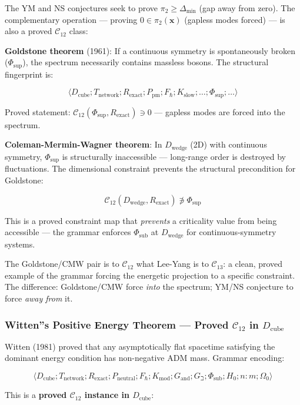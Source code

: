 \documentclass[12pt,a4paper]{article}
\begin{document}
The YM and NS conjectures seek to prove $\pi_2 \geq \Delta_\text{min}$ (gap away from zero). The complementary operation --- proving $0 \in \pi_2(\mathbf{x})$ (gapless modes forced) --- is also a proved $\mathcal{C}_{12}$ class:

\textbf{Goldstone theorem} (1961): If a continuous symmetry is spontaneously broken ($\Phi_\text{sup}$), the spectrum necessarily contains massless bosons. The structural fingerprint is:


\[\langle D_\text{cube}; T_\text{network}; R_\text{exact}; P_\text{pm}; F_{\hbar}; K_\text{slow}; \ldots; \Phi_\text{sup}; \ldots \rangle\]

Proved statement: $\mathcal{C}_{12}(\Phi_\text{sup}, R_\text{exact}) \ni 0$ --- gapless modes are forced into the spectrum. 

\textbf{Coleman-Mermin-Wagner theorem}: In $D_\text{wedge}$ (2D) with continuous symmetry, $\Phi_\text{sup}$ is structurally inaccessible --- long-range order is destroyed by fluctuations. The dimensional constraint prevents the structural precondition for Goldstone:


\[\mathcal{C}_{12}(D_\text{wedge}, R_\text{exact}) \not\ni \Phi_\text{sup}\]

This is a proved constraint map that \emph{prevents} a criticality value from being accessible --- the grammar enforces $\Phi_\text{sub}$ at $D_\text{wedge}$ for continuous-symmetry systems. 

The Goldstone/CMW pair is to $\mathcal{C}_{12}$ what Lee-Yang is to $\mathcal{C}_{13}$: a clean, proved example of the grammar forcing the energetic projection to a specific constraint. The difference: Goldstone/CMW force \emph{into} the spectrum; YM/NS conjecture to force \emph{away from} it.

\subsubsection{Witten''s Positive Energy Theorem --- Proved $\mathcal{C}_{12}$ in $D_\text{cube}$}

Witten (1981) proved that any asymptotically flat spacetime satisfying the dominant energy condition has non-negative ADM mass. Grammar encoding:


\[\langle D_\text{cube}; T_\text{network}; R_\text{exact}; P_\text{neutral}; F_{\hbar}; K_\text{mod}; G_\text{and}; G_{\beth}; \Phi_\text{sub}; H_0; n{:}m; \Omega_0 \rangle\]

This is a \textbf{proved $\mathcal{C}_{12}$ instance in $D_\text{cube}$}:
\end{document}
